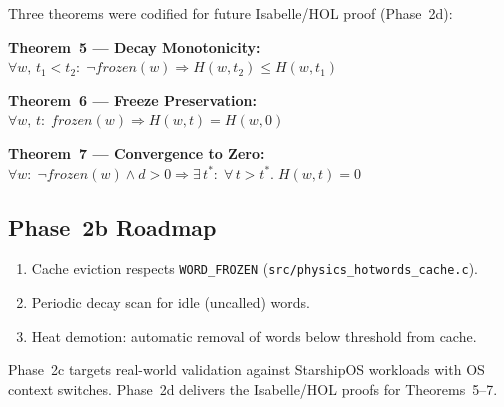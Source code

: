 Three theorems were codified for future Isabelle/HOL proof (Phase~2d):

\textbf{Theorem~5 — Decay Monotonicity:}
$\forall w,\, t_1 < t_2:\; \lnot\textit{frozen}(w) \Rightarrow H(w,t_2) \leq H(w,t_1)$

\textbf{Theorem~6 — Freeze Preservation:}
$\forall w,\, t:\; \textit{frozen}(w) \Rightarrow H(w,t) = H(w,0)$

\textbf{Theorem~7 — Convergence to Zero:}
$\forall w:\; \lnot\textit{frozen}(w) \land d > 0 \Rightarrow \exists\, t^*:\; \forall\, t > t^*.\; H(w,t) = 0$

\subsection{Phase~2b Roadmap}

\begin{enumerate}
  \item Cache eviction respects \texttt{WORD\_FROZEN}
    (\texttt{src/physics\_hotwords\_cache.c}).
  \item Periodic decay scan for idle (uncalled) words.
  \item Heat demotion: automatic removal of words below threshold from cache.
\end{enumerate}

Phase~2c targets real-world validation against StarshipOS workloads with
OS context switches. Phase~2d delivers the Isabelle/HOL proofs for
Theorems~5--7.
